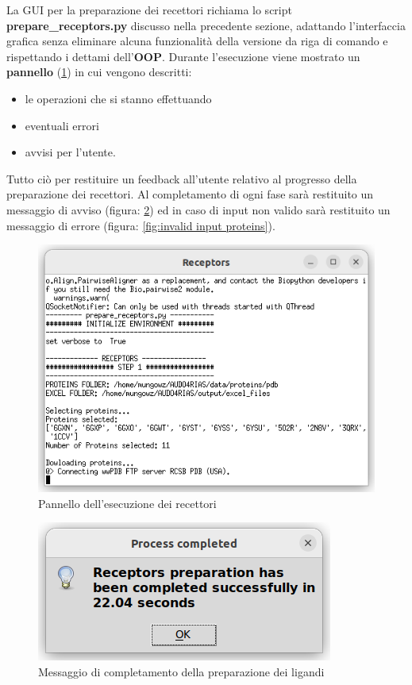 La GUI per la preparazione dei recettori richiama lo script \textbf{prepare\_receptors.py} discusso nella precedente sezione, adattando l'interfaccia grafica senza eliminare alcuna funzionalità della versione da riga di comando e rispettando i dettami dell'\textbf{OOP}.\newline
Durante l'esecuzione viene mostrato un \textbf{pannello} (\ref{fig:receptors execution}) in cui vengono descritti:

\begin{itemize}
    \item le operazioni che si stanno effettuando
    \item eventuali errori
    \item avvisi per l'utente.  
\end{itemize}

Tutto ciò per restituire un feedback all'utente relativo al progresso della preparazione dei recettori. Al completamento di ogni fase sarà restituito un messaggio di avviso (figura: \ref{fig:progress completed proteins}) ed in caso di input non valido sarà restituito un messaggio di errore (figura: \ref{fig:invalid input proteins}).

\begin{figure}[H]
    \centering
    \includegraphics[scale=0.8]{immagini/capitolo3/receptorsExecution.png}
    \caption{Pannello dell'esecuzione dei recettori}
    \label{fig:receptors execution}
\end{figure}

\begin{figure}[H]
    \centering
    \includegraphics{immagini/capitolo3/progressCompletedReceptors.png}
    \caption{Messaggio di completamento della preparazione dei ligandi}
    \label{fig:progress completed proteins}
\end{figure}

